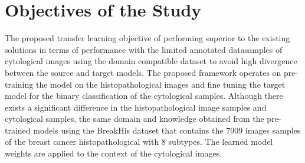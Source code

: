 \section{Objectives of the Study}
The proposed transfer learning objective of performing superior to the existing solutions in terms of performance with the limited annotated datasamples of cytological images using the domain compatible dataset to avoid high divergence between the source and target models. 
The proposed framework operates on pre-training the model  on the histopathological images and fine tuning the target model for the binary classification of the cytological samples. 
Although there exists a significant difference in the histopathological image samples and cytological samples, the same domain and knowledge obtained from the pre-trained models using the BreakHis dataset \citep{spanhol2015dataset} that contains the 7909 images samples of the breast cancer histopathological  with 8 subtypes. The learned model weights are applied to the context of the cytological images. 


